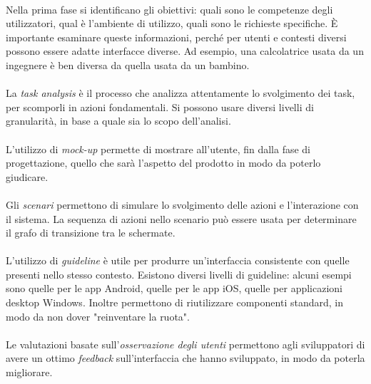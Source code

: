 \documentclass[11pt,a4paper,english]{article}
\begin{document}
\paragraph{} Nella prima fase si identificano gli obiettivi: quali sono le competenze degli utilizzatori, qual è l'ambiente di utilizzo, quali sono le richieste specifiche. È importante esaminare queste informazioni, perché per utenti e contesti diversi possono essere adatte interfacce diverse. Ad esempio, una calcolatrice usata da un ingegnere è ben diversa da quella usata da un bambino. 

\paragraph{} La \emph{task analysis} è il processo che analizza attentamente lo svolgimento dei task, per scomporli in azioni fondamentali. Si possono usare diversi livelli di granularità, in base a quale sia lo scopo dell'analisi. 

\paragraph{} L'utilizzo di \emph{mock-up} permette di mostrare all'utente, fin dalla fase di progettazione, quello che sarà l'aspetto del prodotto in modo da poterlo giudicare.

\paragraph{} Gli \emph{scenari} permettono di simulare lo svolgimento delle azioni e l'interazione con il sistema. La sequenza di azioni nello scenario può essere usata per determinare il grafo di transizione tra le schermate.

\paragraph{} L'utilizzo di \emph{guideline} è utile per produrre un'interfaccia consistente con quelle presenti nello stesso contesto. Esistono diversi livelli di guideline: alcuni esempi sono quelle per le app Android, quelle per le app iOS, quelle per applicazioni desktop Windows. Inoltre permettono di riutilizzare componenti standard, in modo da non dover "reinventare la ruota". 

\paragraph{} Le valutazioni basate sull'\emph{osservazione degli utenti} permettono agli sviluppatori di avere un ottimo \emph{feedback} sull'interfaccia che hanno sviluppato, in modo da poterla migliorare.
\end{document}
